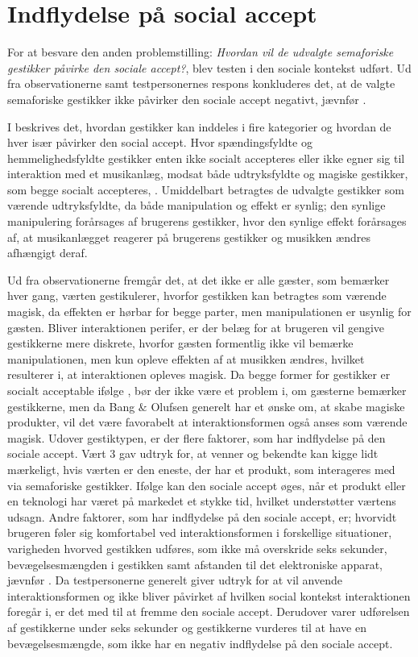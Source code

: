 \section{Indflydelse på social accept}
\label{DiskussionSocialAccept}
%
For at besvare den anden problemstilling: \textit{Hvordan vil de udvalgte semaforiske gestikker påvirke den sociale accept?}, blev testen i den sociale kontekst udført. Ud fra observationerne samt testpersonernes respons konkluderes det, at de valgte semaforiske gestikker ikke påvirker den sociale accept negativt, jævnfør .
 
I  beskrives det, hvordan gestikker kan inddeles i fire kategorier og hvordan de hver især påvirker den social accept. Hvor spændingsfyldte og hemmelighedsfyldte gestikker enten ikke socialt accepteres eller ikke egner sig til interaktion med et musikanlæg, modsat både udtryksfyldte og magiske gestikker, som begge socialt accepteres, \parencite[s. 276]{PDF:WouldYouDoThat}. Umiddelbart betragtes de udvalgte gestikker som værende udtryksfyldte, da både manipulation og effekt er synlig; den synlige manipulering forårsages af brugerens gestikker, hvor den synlige effekt forårsages af, at musikanlægget reagerer på brugerens gestikker og musikken ændres afhængigt deraf.

Ud fra observationerne fremgår det, at det ikke er alle gæster, som bemærker hver gang, værten gestikulerer, hvorfor gestikken kan betragtes som værende magisk, da effekten er hørbar for begge parter, men manipulationen er usynlig for gæsten. Bliver interaktionen perifer, er der belæg for at brugeren vil gengive gestikkerne mere diskrete, hvorfor gæsten formentlig ikke vil bemærke manipulationen, men kun opleve effekten af at musikken ændres, hvilket resulterer i, at interaktionen opleves magisk. Da begge former for gestikker er socialt acceptable ifølge \textcite[s. 277]{PDF:WouldYouDoThat}, bør der ikke være et problem i, om gæsterne bemærker gestikkerne, men da Bang $\&$ Olufsen generelt har et ønske om, at skabe magiske produkter, vil det være favorabelt at interaktionsformen også anses som værende magisk.\blankline
%
Udover gestiktypen, er der flere faktorer, som har indflydelse på den sociale accept. Vært 3 gav udtryk for, at venner og bekendte kan kigge lidt mærkeligt, hvis værten er den eneste, der har et produkt, som interageres med via semaforiske gestikker. Ifølge \textcite[s. 276]{PDF:WouldYouDoThat} kan den sociale accept øges, når et produkt eller en teknologi har været på markedet et stykke tid, hvilket understøtter værtens udsagn. Andre faktorer, som har indflydelse på den sociale accept, er; hvorvidt brugeren føler sig komfortabel ved interaktionsformen i forskellige situationer, varigheden hvorved gestikken udføres, som ikke må overskride seks sekunder, bevægelsesmængden i gestikken samt afstanden til det elektroniske apparat, jævnfør . Da testpersonerne generelt giver udtryk for at vil anvende interaktionsformen og ikke bliver påvirket af hvilken social kontekst interaktionen foregår i, er det med til at fremme den sociale accept. Derudover varer udførelsen af gestikkerne under seks sekunder og gestikkerne vurderes til at have en bevægelsesmængde, som ikke har en negativ indflydelse på den sociale accept. 

